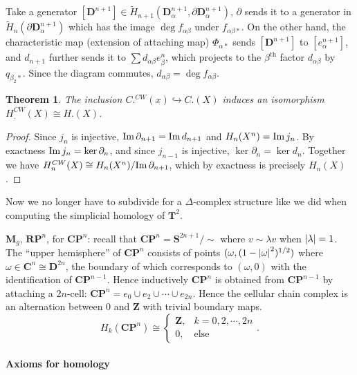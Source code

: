 \documentclass[11pt]{article}
\theoremstyle{definition}
\theoremstyle{plain}
\newtheorem{theorem}{Theorem}[section]
\newcommand{\im}{\textup{Im}\,}
\newcommand{\Z}{\mathbf{Z}}
\begin{document}
Take a generator $[\mathbf{D}^{n+1}]\in\widetilde{H}_{n+1}(\mathbf{D}_\alpha^{n+1},\partial\mathbf{D}^{n+1}_\alpha)$, $\partial$ sends it to a generator in $\widetilde{H}_n(\partial\mathbf{D}_\alpha^{n+1})$ which has the image $\deg f_{\alpha\beta}$ under $f_{\alpha\beta\ast}$. On the other hand, the characteristic map (extension of attaching map) $\Phi_{\alpha\ast}$ sends $[\mathbf{D}^{n+1}]$ to $[e_\alpha^{n+1}]$, and $d_{n+1}$ further sends it to $\sum d_{\alpha\beta}e_\beta^n$, which projects to the $\beta^{\mathrm{th}}$ factor $d_{\alpha\beta}$ by $q_{\beta_2\ast}$. Since the diagram commutes, $d_{\alpha\beta}=\deg f_{\alpha\beta}$.

\begin{theorem}
The inclusion $C.^{CW}(x)\hookrightarrow C.(X)$ induces an isomorphism
$H_.^{CW}(X)\cong H.(X)$.
\end{theorem}
\begin{proof}
Since $j_n$ is injective, $\im\partial_{n+1}=\im d_{n+1}$ and $H_n(X^n)=\im j_n$. By exactness $\im j_n=\ker\partial_n$, and since $j_{n-1}$ is injective, $\ker\partial_n=\ker d_n$. Together we have $H_n^{CW}(X)\cong H_n(X^n)/\im\partial_{n+1}$, which by exactness is precisely $H_n(X)$.
\end{proof}

Now we no longer have to subdivide for a $\Delta$-complex structure like we did when computing the simplicial homology of $\mathbf{T}^2$.\medbreak

$\mathbf{M}_g$, $\mathbf{RP}^n$, for $\mathbf{CP}^n$: recall that $\mathbf{CP}^n=\mathbf{S}^{2n+1}/\sim$ where $v\sim\lambda v$ when $\abs{\lambda}=1$. The ``upper hemisphere'' of $\mathbf{CP}^n$ consists of points $(\omega,(1-\abs{\omega}^2)^{1/2})$ where $\omega\in\mathbf{C}^n\cong\mathbf{D}^{2n}$, the boundary of which corresponds to $(\omega,0)$ with the identification of $\mathbf{CP}^{n-1}$. Hence inductively $\mathbf{CP}^n$ is obtained from $\mathbf{CP}^{n-1}$ by attaching a $2n$-cell: $\mathbf{CP}^n=e_0\cup e_2\cup\cdots\cup e_{2n}$. Hence the cellular chain complex is an alternation between $0$ and $\Z$ with trivial boundary maps.
\[H_k(\mathbf{CP}^n)\cong\begin{cases}
\Z,&k=0,2,\cdots,2n\\0,&\textrm{else}
\end{cases}.\]

\paragraph{Axioms for homology}
\end{document}
